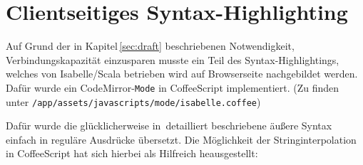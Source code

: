 \section{Clientseitiges Syntax-Highlighting}
\label{sec:syntax}

Auf Grund der in Kapitel\,\ref{sec:draft} beschriebenen Notwendigkeit, Verbindungskapazität
einzusparen musste ein Teil des Syntax-Highlightings, welches von Isabelle/Scala betrieben wird auf
Browserseite nachgebildet werden. Dafür wurde ein CodeMirror-\texttt{Mode} in CoffeeScript
implementiert. (Zu finden unter \texttt{/app/assets/javascripts/mode/isabelle.coffee})

Dafür wurde die glücklicherweise in\,\cite{isabelle} detailliert beschriebene äußere Syntax einfach
in reguläre Ausdrücke übersetzt. Die Möglichkeit der Stringinterpolation in CoffeeScript hat sich
hierbei als Hilfreich heausgestellt:

